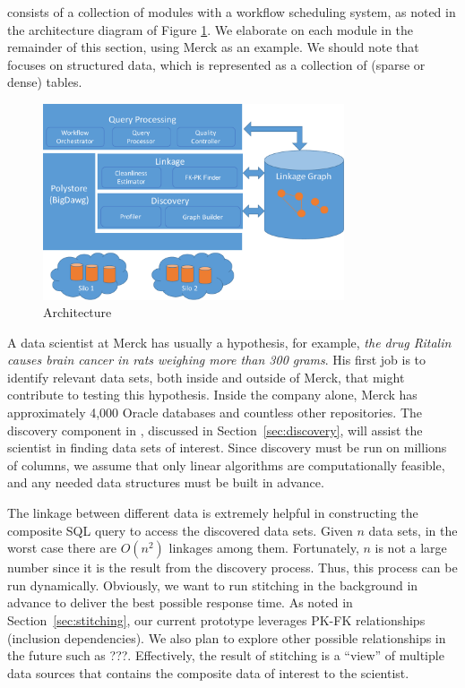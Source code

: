 \dcv consists of a collection of modules with a workflow scheduling system, as noted in the architecture diagram of Figure \ref{fig:arch}. We elaborate on each module in the remainder of this section, using Merck as an example.
We should note that \dcv focuses on structured data, which is represented as a collection of (sparse or dense) tables.


\begin{figure}[!t]
\includegraphics[width=3.5in]{arch3.pdf}
\caption{\dcv Architecture}
\label{fig:arch}
\end{figure}


\stitle{[Discovery.]} 
A data scientist at Merck has usually a hypothesis, for example, {\it the drug Ritalin causes brain cancer in rats weighing more than 300 grams}.
His first job is to identify relevant data sets, both inside and outside of Merck, that might contribute to testing this hypothesis. Inside the company alone, Merck has approximately 4,000 Oracle databases and countless other repositories. The discovery component in \dcv, discussed in Section~\ref{sec:discovery}, will assist the scientist in finding data sets of interest.  Since discovery must be run on millions of columns, we assume that only linear algorithms are computationally feasible, and any needed data structures must be built in advance.


The linkage between different data is extremely helpful in constructing the composite \textsf{SQL} query to access the discovered data sets.
Given $n$ data sets, in the worst case there are $O(n^2)$ linkages among them.
Fortunately, $n$ is not a large number since it is the result from the discovery process. Thus, this process can be run dynamically. Obviously, we want to run stitching in the background in advance to deliver the best possible response time. As noted in Section~\ref{sec:stitching}, our current prototype leverages PK-FK relationships (inclusion dependencies).
We also plan to explore other possible relationships in the future such as ???.
Effectively, the result of stitching is a ``view'' of multiple data sources that contains the composite data of interest to the scientist.


